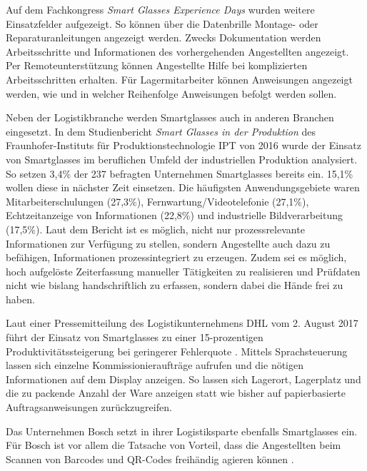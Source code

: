 Auf dem Fachkongress \emph{Smart Glasses Experience Days} \cite{Manokaran-Pathamathan2017} wurden weitere Einsatzfelder aufgezeigt. So können über die Datenbrille Montage- oder Reparaturanleitungen angezeigt werden. Zwecks Dokumentation werden Arbeitsschritte und Informationen des vorhergehenden Angestellten angezeigt. Per Remoteunterstützung können Angestellte Hilfe bei komplizierten Arbeitsschritten erhalten. Für Lagermitarbeiter können Anweisungen angezeigt werden, wie und in welcher Reihenfolge Anweisungen befolgt werden sollen.

Neben der Logistikbranche werden Smartglasses auch in anderen Branchen eingesetzt. In dem Studienbericht \emph{Smart Glasses in der Produktion} des Fraunhofer-Instituts für Produktionstechnologie IPT von 2016 \cite{Plutz} wurde der Einsatz von Smartglasses im beruflichen Umfeld der industriellen Produktion analysiert. So setzen 3,4\% der 237 befragten Unternehmen  Smartglasses bereits ein. 15,1\% wollen diese in nächster Zeit einsetzen. Die häufigsten Anwendungsgebiete waren Mitarbeiterschulungen (27,3\%), Fernwartung/Videotelefonie (27,1\%), Echtzeitanzeige von Informationen (22,8\%) und industrielle Bildverarbeitung (17,5\%). Laut dem Bericht ist es möglich, nicht nur prozessrelevante Informationen zur Verfügung zu stellen, sondern Angestellte auch dazu zu befähigen, Informationen prozessintegriert zu erzeugen. Zudem sei es möglich, hoch aufgelöste Zeiterfassung manueller Tätigkeiten zu realisieren und Prüfdaten nicht wie bislang handschriftlich zu erfassen, sondern dabei die Hände frei zu haben.

Laut einer Pressemitteilung des Logistikunternehmens DHL vom 2. August 2017 führt der Einsatz von Smartglasses zu einer 15-prozentigen Produktivitätssteigerung bei geringerer Fehlerquote \cite{DeutschePostDHLGroup2017}. Mittels Sprachsteuerung lassen sich einzelne Kommissionieraufträge aufrufen und die nötigen Informationen auf dem Display anzeigen. So lassen sich Lagerort, Lagerplatz und die zu packende Anzahl der Ware anzeigen statt wie bisher auf papierbasierte Auftragsanweisungen zurückzugreifen. 

Das Unternehmen Bosch setzt in ihrer Logistiksparte ebenfalls Smartglasses ein. Für Bosch ist vor allem die Tatsache von Vorteil, dass die Angestellten beim Scannen von Barcodes und QR-Codes freihändig agieren können \cite{Spinger2014}. 